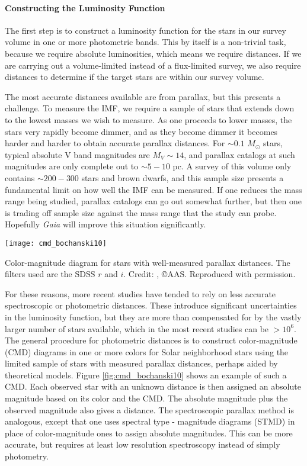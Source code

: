 \paragraph{Constructing the Luminosity Function}

The first step is to construct a luminosity function for the stars in our survey volume in one or more photometric bands. This by itself is a non-trivial task, because we require absolute luminosities, which means we require distances. If we are carrying out a volume-limited instead of a flux-limited survey, we also require distances to determine if the target stars are within our survey volume.

The most accurate distances available are from parallax, but this presents a challenge. To measure the IMF, we require a sample of stars that extends down to the lowest masses we wish to measure. As one proceeds to lower masses, the stars very rapidly become dimmer, and as they become dimmer it becomes harder and harder to obtain accurate parallax distances. For $\sim 0.1$ $M_\odot$ stars, typical absolute V band magnitudes are $M_V \sim 14$, and parallax catalogs at such magnitudes are only complete out to $\sim 5-10$ pc. A survey of this volume only contains $\sim 200-300$ stars and brown dwarfs, and this sample size presents a fundamental limit on how well the IMF can be measured. If one reduces the mass range being studied, parallax catalogs can go out somewhat further, but then one is trading off sample size against the mass range that the study can probe. Hopefully \textit{Gaia} will improve this situation significantly.

\begin{marginfigure}
\texttt{[image: cmd\_bochanski10]}
\caption[Color-magnitude diagram of nearby stars]{
\label{fig:cmd_bochanski10}
Color-magnitude diagram for stars with well-measured parallax distances. The filters used are the SDSS $r$ and $i$. Credit: \citet{bochanski10a}, \copyright AAS. Reproduced with permission.
}
\end{marginfigure}

For these reasons, more recent studies have tended to rely on less accurate spectroscopic or photometric distances. These introduce significant uncertainties in the luminosity function, but they are more than compensated for by the vastly larger number of stars available, which in the most recent studies can be $>10^6$. The general procedure for photometric distances is to construct color-magnitude (CMD) diagrams in one or more colors for Solar neighborhood stars using the limited sample of stars with measured parallax distances, perhaps aided by theoretical models. Figure \ref{fig:cmd_bochanski10} shows an example of such a CMD. Each observed star with an unknown distance is then assigned an absolute magnitude based on its color and the CMD. The absolute magnitude plus the observed magnitude also gives a distance. The spectroscopic parallax method is analogous, except that one uses spectral type - magnitude diagrams (STMD) in place of color-magnitude ones to assign absolute magnitudes. This can be more accurate, but requires at least low resolution spectroscopy instead of simply photometry.

